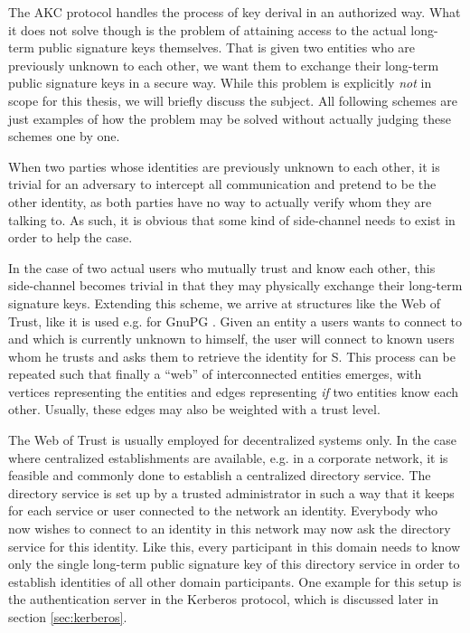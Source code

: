 The AKC protocol handles the process of key derival in an authorized way.
What it does not solve though is the problem of attaining access to the actual long-term public signature keys themselves.
That is given two entities who are previously unknown to each other, we want them to exchange their long-term public signature keys in a secure way.
While this problem is explicitly \emph{not} in scope for this thesis, we will briefly discuss the subject.
All following schemes are just examples of how the problem may be solved without actually judging these schemes one by one.

When two parties whose identities are previously unknown to each other, it is trivial for an adversary to intercept all communication and pretend to be the other identity, as both parties have no way to actually verify whom they are talking to.
As such, it is obvious that some kind of side-channel needs to exist in order to help the case.

In the case of two actual users who mutually trust and know each other, this side-channel becomes trivial in that they may physically exchange their long-term signature keys.
Extending this scheme, we arrive at structures like the Web of Trust, like it is used e.g. for GnuPG \cite{gnupg}.
Given an entity a users wants to connect to and which is currently unknown to himself, the user will connect to known users whom he trusts and asks them to retrieve the identity for S.
This process can be repeated such that finally a ``web'' of interconnected entities emerges, with vertices representing the entities and edges representing \emph{if} two entities know each other.
Usually, these edges may also be weighted with a trust level.

The Web of Trust is usually employed for decentralized systems only.
In the case where centralized establishments are available, e.g. in a corporate network, it is feasible and commonly done to establish a centralized directory service.
The directory service is set up by a trusted administrator in such a way that it keeps for each service or user connected to the network an identity.
Everybody who now wishes to connect to an identity in this network may now ask the directory service for this identity.
Like this, every participant in this domain needs to know only the single long-term public signature key of this directory service in order to establish identities of all other domain participants.
One example for this setup is the authentication server in the Kerberos protocol, which is discussed later in section \ref{sec:kerberos}.

